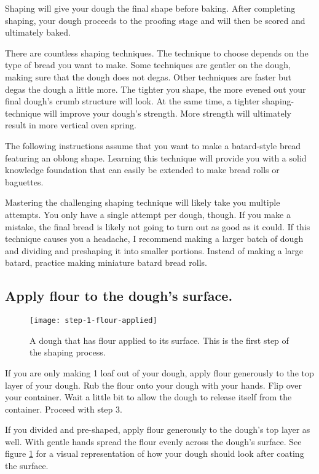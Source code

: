Shaping will give your dough the final shape before baking. After
completing shaping, your dough proceeds to the proofing stage and
will then be scored and ultimately baked.

There are countless shaping techniques. The technique to choose
depends on the type of bread you want to make. Some techniques
are gentler on the dough, making sure that the dough does not
degas. Other techniques are faster but degas the dough a little
more. The tighter you shape, the more evened out your final dough's
crumb structure will look. At the same time, a tighter shaping-technique
will improve your dough's strength. More strength will ultimately result
in more vertical oven spring.

The following instructions assume that you want to make a batard-style
bread featuring an oblong shape. Learning this technique
will provide you with a solid knowledge foundation that
can easily be extended to make bread rolls or baguettes.

Mastering the challenging shaping technique will likely take you
multiple attempts. You only have a single attempt per dough, though. If you
make a mistake, the final bread is likely not going to turn out as good
as it could. If this technique causes you a headache, I recommend making
a larger batch of dough and dividing and preshaping it into
smaller portions. Instead of making a large batard, practice making miniature
batard bread rolls.

\subsection[Flouring the surface]{Apply flour to the dough's surface.}

\begin{figure}[!htb]
  \texttt{[image: step-1-flour-applied]}
  \caption{A dough that has flour applied to its surface. This is
  the first step of the shaping process.}
  \label{fig:shaping-flour-surface}
\end{figure}

If you are only making 1 loaf out of your dough, apply flour
generously to the top layer of your dough. Rub the flour onto your
dough with your hands. Flip over your container. Wait a little bit
to allow the dough to release itself from the container. Proceed
with step 3.

If you divided and pre-shaped, apply flour generously to the dough's
top layer as well. With gentle hands spread the flour evenly across
the dough's surface. See figure \ref{fig:shaping-flour-surface} for a
visual representation of how your dough should look after coating
the surface.

